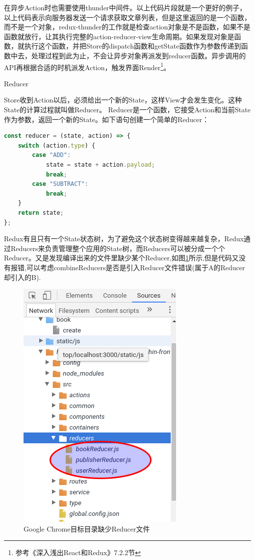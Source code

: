 \documentclass[12pt]{book}
\makeatletter
\numberwithin{dummy}{section}
\theoremstyle{ocrenumbox}
\theoremstyle{blacknumex}
\theoremstyle{blacknumbox}
\theoremstyle{ocrenum}
\renewcommand{\subsection}{\@startsection {subsection}{2}{\z@}
	{-3ex \@plus -0.1ex \@minus -.4ex}
	{0.5ex \@plus.2ex }
	{\normalfont\sffamily\bfseries}}
\makeatother
\begin{document}
在异步Action时也需要使用thunder中间件。以上代码片段就是一个更好的例子，以上代码表示向服务器发送一个请求获取文章列表，但是这里返回的是一个函数，而不是一个对象，redux-thunder的工作就是检查action对象是不是函数，如果不是函数就放行，让其执行完整的action-reducer-view生命周期。如果发现对象是函数，就执行这个函数，并把Store的dispatch函数和getState函数作为参数传递到函数中去，处理过程到此为止，不会让异步对象再派发到reducer函数。异步调用的API再根据合适的时机派发Action，触发界面Render\footnote{参考《深入浅出React和Redux》7.2.2节}。

\subsection{Reducer}

Store收到Action以后，必须给出一个新的State，这样View才会发生变化。这种State的计算过程就叫做Reducer。
Reducer是一个函数，它接受Action和当前State作为参数，返回一个新的State。如下语句创建一个简单的Reducer：

\begin{lstlisting}[language=Javascript]
const reducer = (state, action) => {
	switch (action.type) {
		case "ADD":
			state = state + action.payload;
			break;
		case "SUBTRACT":
			break;
	}
	return state;
};
\end{lstlisting}

Redux有且只有一个State状态树，为了避免这个状态树变得越来越复杂，Redux通过Reducers来负责管理整个应用的State树，而Reducers可以被分成一个个Reducer。又是发现编译出来的文件里缺少某个Reducer,如图\ref{fig:distdirectoryreducer}所示,但是代码又没有报错,可以考虑combineReducers是否是引入Reducer文件错误(属于A的Reducer却引入的B).

\begin{figure}[htbp]
	\centering
	\includegraphics[scale=0.5]{distdirectoryreducer.png}
	\caption{Google Chrome目标目录缺少Reducer文件}
	\label{fig:distdirectoryreducer}
\end{figure}
\end{document}

